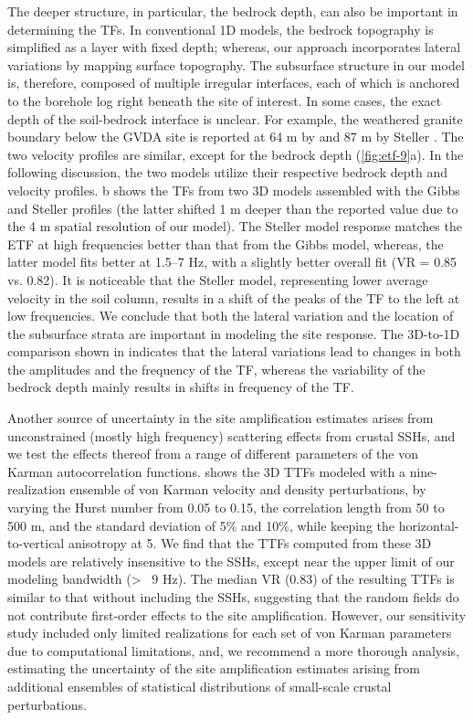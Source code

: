 The deeper structure, in particular, the bedrock depth, can also be important in determining the TFs. In conventional 1D models, the bedrock topography is simplified as a layer with fixed depth; whereas, our approach incorporates lateral variations by mapping surface topography. The subsurface structure in our model is, therefore, composed of multiple irregular interfaces, each of which is anchored to the borehole log right beneath the site of interest. In some cases, the exact depth of the soil-bedrock interface is unclear. For example, the weathered granite boundary below the GVDA site is reported at 64 m by \citet{gibbsNearsurfaceSwaveVelocities1989} and 87 m by Steller \citet{stellerNewBoreholeGeophysical1996}. The two velocity profiles are similar, except for the bedrock depth (\cref{fig:etf-9}a). In the following discussion, the two models utilize their respective bedrock depth and velocity profiles. b shows the TFs from two 3D models assembled with the Gibbs and Steller profiles (the latter shifted 1 m deeper than the reported value due to the 4 m spatial resolution of our model). The Steller model response matches the ETF at high frequencies better than that from the Gibbs model, whereas, the latter model fits better at 1.5–7 Hz, with a slightly better overall fit (VR = 0.85 vs. 0.82). It is noticeable that the Steller model, representing lower average velocity in the soil column, results in a shift of the peaks of the TF to the left at low frequencies. We conclude that both the lateral variation and the location of the subsurface strata are important in modeling the site response. The 3D-to-1D comparison shown in  indicates that the lateral variations lead to changes in both the amplitudes and the frequency of the TF, whereas the variability of the bedrock depth mainly results in shifts in frequency of the TF.

Another source of uncertainty in the site amplification estimates arises from unconstrained (mostly high frequency) scattering effects from crustal SSHs, and we test the effects thereof from a range of different parameters of the von Karman autocorrelation functions.  shows the 3D TTFs modeled with a nine-realization ensemble of von Karman velocity and density perturbations, by varying the Hurst number from 0.05 to 0.15, the correlation length from 50 to 500 m, and the standard deviation of 5\% and 10\%, while keeping the horizontal-to-vertical anisotropy at 5. We find that the TTFs computed from these 3D models are relatively insensitive to the SSHs, except near the upper limit of our modeling bandwidth (> ~9 Hz). The median VR (0.83) of the resulting TTFs is similar to that without including the SSHs, suggesting that the random fields do not contribute first-order effects to the site amplification. However, our sensitivity study included only limited realizations for each set of von Karman parameters due to computational limitations, and, we recommend a more thorough analysis, estimating the uncertainty of the site amplification estimates arising from additional ensembles of statistical distributions of small-scale crustal perturbations.

